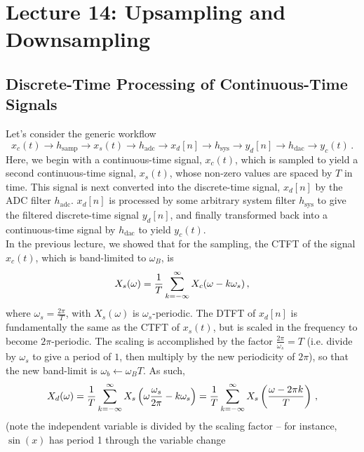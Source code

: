 \section{Lecture 14: Upsampling and Downsampling}

\subsection{Discrete-Time Processing of Continuous-Time Signals}
%
Let's consider the generic workflow
%
\begin{displaymath}
  x_c(t) \longrightarrow \boxed{h_\mathrm{samp}}
  \longrightarrow x_s(t) \longrightarrow \boxed{h_\mathrm{adc}}
  \longrightarrow x_d[n] \longrightarrow \boxed{h_\mathrm{sys}}
  \longrightarrow y_d[n] \longrightarrow \boxed{h_\mathrm{dac}}
  \longrightarrow y_c(t) \,.
\end{displaymath}
%
Here, we begin with a continuous-time signal, $x_c(t)$, which is sampled
to yield a second continuous-time signal, $x_s(t)$, whose non-zero values are
spaced by $T$ in time. This signal is next converted into the discrete-time
signal, $x_d[n]$ by the ADC filter $h_\mathrm{adc}$. $x_d[n]$ is processed
by some arbitrary system filter $h_\mathrm{sys}$ to give the filtered
discrete-time signal $y_d[n]$, and finally transformed back into a
continuous-time signal by $h_\mathrm{dac}$ to yield $y_c(t)$.\\
%
In the previous lecture, we showed that for the sampling, the CTFT
of the signal $x_c(t)$, which is band-limited to $\omega_B$, is
%
\begin{displaymath}
  X_s(\omega) = \frac{1}{T}\sum_{k=-\infty}^\infty X_c(\omega - k\omega_s) \,,
\end{displaymath}
%
where $\omega_s = \frac{2\pi}{T}$, with $X_s(\omega)$ is $\omega_s$-periodic.
The DTFT of $x_d[n]$ is fundamentally the same as the CTFT of $x_s(t)$, but
is scaled in the frequency to become $2\pi$-periodic. The scaling is accomplished
by the factor $\frac{2\pi}{\omega_s} = T$ (i.e. divide by $\omega_s$ to give a
period of $1$, then multiply by the new periodicity of $2\pi$), so that the
new band-limit is $\omega_b \leftarrow \omega_B T$. As such,
%
\begin{displaymath}
  X_d(\omega) = \frac{1}{T}\sum_{k=-\infty}^\infty X_s\left(\omega\frac{\omega_s}{2\pi} - k\omega_s\right)
    = \frac{1}{T}\sum_{k=-\infty}^\infty X_s\left(\frac{\omega - 2\pi k}{T}\right) \,,
\end{displaymath}
%
(note the independent variable is divided by the scaling factor --
for instance, $\sin(x)$ has period 1 through the variable change
